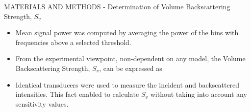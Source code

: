 \documentclass[handout]{beamer}
\newcommand\Fontable{\fontsize{9}{10}\selectfont}
\begin{document}
\begin{frame}{MATERIALS AND METHODS - Determination of Volume Backscattering Strength, $S_v$}
\Fontable
\begin{minipage}[c]{1\linewidth}
\begin{minipage}[c]{0.46\linewidth}
\begin{itemize}
\vspace{1pc}
\item<2-> Mean signal power was computed by averaging the power of the bins with frequencies above a selected threshold.
\item<3-> From the experimental viewpoint, non-dependent on any model, the Volume Backscattering Strength, $S_v$, can be expressed as
\item<4-> Identical transducers were used to measure the incident and backscattered intensities. This fact enabled to calculate $S_v$ without taking into account any sensitivity values.
\end{itemize}
 
\end{minipage}
\begin{minipage}[c]{0.55\linewidth}


\hspace{1pc}
\scriptsize

\end{minipage}
\end{minipage}
\end{frame}
\end{document}
